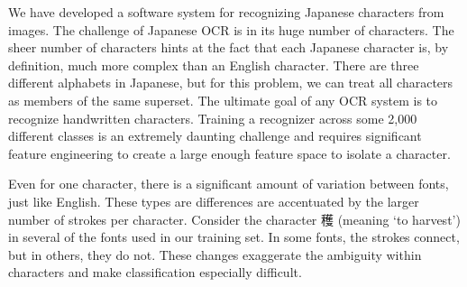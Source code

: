 \documentclass[10pt,twocolumn,letterpaper]{article}
\begin{document}
We have developed a software system for recognizing Japanese characters from images. The challenge of Japanese OCR is in its huge number of characters. The sheer number of characters hints at the fact that each Japanese character is, by definition, much more complex than an English character. There are three different alphabets in Japanese, but for this problem, we can treat all characters as members of the same superset. The ultimate goal of any OCR system is to recognize handwritten characters. Training a recognizer across some 2,000 different classes is an extremely daunting challenge and requires significant feature engineering to create a large enough feature space to isolate a character.

Even for one character, there is a significant amount of variation between fonts, just like English. These types are differences are accentuated by the larger number of strokes per character. Consider the character 穫 (meaning ‘to harvest’) in several of the fonts used in our training set. In some fonts, the strokes connect, but in others, they do not. These changes exaggerate the ambiguity within characters and make classification especially difficult.
\end{document}
